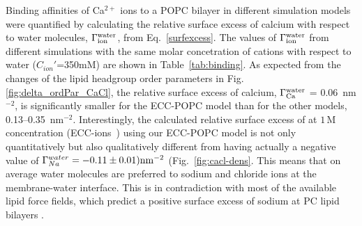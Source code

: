 Binding affinities of Ca$^{2+}$ ions to a POPC bilayer in different simulation models were quantified by calculating the relative surface excess of calcium with respect to water molecules, $\Gamma_{\rm ion}^{\rm water}$, from Eq.~\ref{surfexcess}. 
The values of $\Gamma_{\rm ion}^{\rm water}$ 
from different simulations with the same molar concetration of cations with respect 
to water ($C_{ion}'$=350mM) are shown in Table~\ref{tab:binding}. 
As expected from the changes of the lipid headgroup order parameters in Fig.~ \ref{fig:delta_ordPar_CaCl}, the relative surface excess of calcium, $\Gamma_{\rm Ca}^{\rm water}$ = 0.06~nm$^{-2}$, is significantly smaller for the ECC-POPC model than for the other models, 0.13--0.35~nm$^{-2}$. 
Interestingly, the calculated relative surface excess of  at $1\,\mathrm{M}$ concentration (ECC-ions~\citep{Pluharova2014}) using our ECC-POPC model is not only quantitatively but also qualitatively different from  having actually a negative value of $\Gamma_{Na}^{water} = -0.11 \pm 0.01) \rm{nm}^{-2}$ (Fig.~\ref{fig:cacl-dens}. This  
means that on average water molecules are preferred to sodium and chloride ions at the membrane-water interface.   
This is in contradiction with most of the available lipid force fields, which predict a positive surface excess of sodium at PC lipid bilayers \citep{catte16}. 
 
